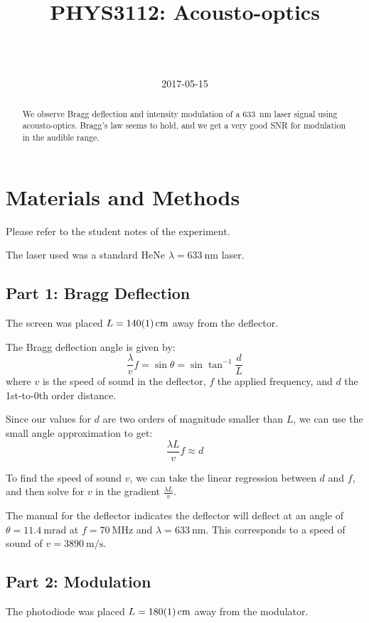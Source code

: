 \documentclass[a4paper]{scrartcl}
\begin{document}
\title{PHYS3112: Acousto-optics}
\author{ \\ \\ }
\date{2017-05-15}
\maketitle

\begin{abstract}
    We observe Bragg deflection and intensity modulation of a \SI{633}{\nano\metre} laser signal using acousto-optics. Bragg's law seems to hold, and we get a very good SNR for modulation in the audible range.
\end{abstract}

\section{Materials and Methods}
Please refer to the student notes of the experiment.

The laser used was a standard HeNe \(\lambda = \SI{633}{\nano\metre}\) laser.

\subsection{Part 1: Bragg Deflection}
The screen was placed \(L = \SI{140 \pm 1}{\centi\metre}\) away from the deflector.

The Bragg deflection angle is given by:
\[\frac{\lambda}{v} f = \sin \theta = \sin \tan^{-1} \frac{d}{L}\]
where \(v\) is the speed of sound in the deflector, \(f\) the applied frequency, and \(d\) the 1st-to-0th order distance.

Since our values for \(d\) are two orders of magnitude smaller than \(L\), we can use the small angle approximation to get:
\[\frac{\lambda L}{v} f \approx d\]

To find the speed of sound \(v\), we can take the linear regression between \(d\) and \(f\), and then solve for \(v\) in the gradient \(\frac{\lambda L}{v}\).

The manual for the deflector indicates the deflector will deflect at an angle of \(\theta = \SI{11.4}{\milli\radian}\) at \(f = \SI{70}{\mega\hertz}\) and \(\lambda = \SI{633}{\nano\metre}\). This corresponds to a speed of sound of \(v = \SI{3890}{\metre\per\second}\).

\subsection{Part 2: Modulation}
The photodiode was placed \(L = \SI{180 \pm 1}{\centi\metre}\) away from the modulator.
\end{document}
